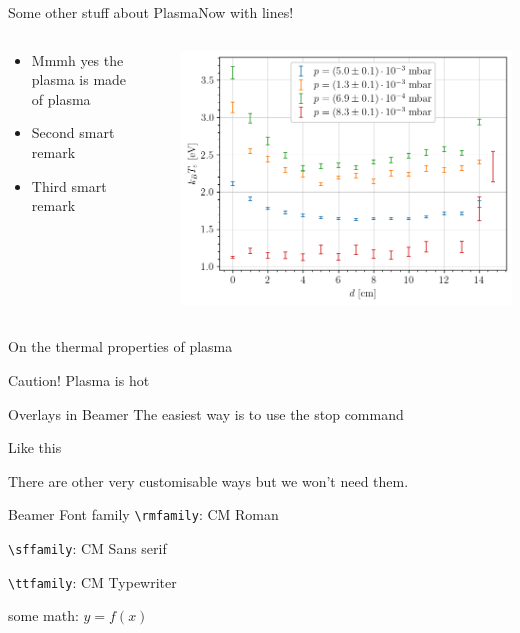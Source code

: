 \documentclass[11pt]{beamer}
\begin{document}
\begin{frame}{Some other stuff about Plasma}{Now with lines!}
    \begin{columns}
    \begin{column}{0.49\textwidth}
        \begin{itemize}
            \item Mmmh yes the plasma is made of plasma
            \item Second smart remark
            \item Third smart remark
        \end{itemize}
    \end{column}
    \begin{column}{.02\textwidth}
        \rule{.1mm}{0.7\textheight}
    \end{column}
    \begin{column}{0.49\textwidth}
        \includegraphics[width=\textwidth]{../figures/temperatureeV_position.png}
    \end{column}
    \end{columns}
\end{frame}

\begin{frame}{On the thermal properties of plasma}
    \begin{block}{Caution!}
        Plasma is hot
    \end{block}
\end{frame}

\begin{frame}{Overlays in Beamer}
    The easiest way is to use the stop command
    \pause

    Like this
    \pause

    There are other very customisable ways but we won't need them.
\end{frame}

\begin{frame}[fragile]{Beamer Font family}
    \verb|\rmfamily|: \rmfamily CM Roman

    \verb|\sffamily|: \sffamily CM Sans serif

    \verb|\ttfamily|: \ttfamily CM Typewriter

    some math: $y = f(x)$
\end{frame}
\end{document}
